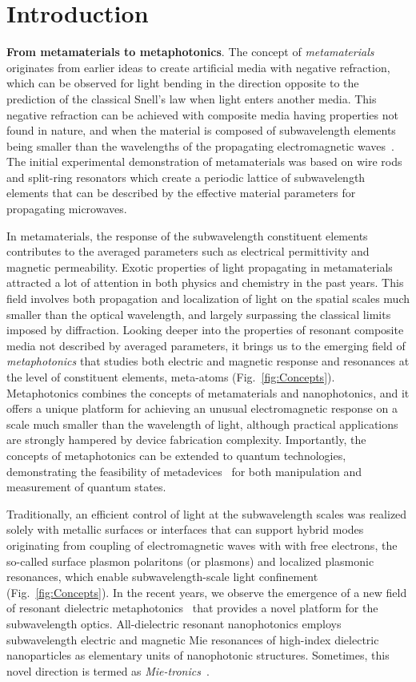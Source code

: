 \documentclass[journal=chreay,manuscript=review]{achemso}
\begin{document}
\section{Introduction}

{\bf From metamaterials to metaphotonics}. The concept of {\it metamaterials} originates from earlier ideas to create artificial media with negative refraction, which can be observed for light bending in the direction opposite to the prediction of the classical Snell’s law when light enters another media. This negative refraction can be achieved with composite media having properties not found in nature, and when the material is composed of subwavelength elements being smaller than the wavelengths of the propagating electromagnetic waves~\cite{xiang_2011}. The initial experimental demonstration of metamaterials was based on wire rods and split-ring resonators \cite{smith_2004} which create a periodic lattice of subwavelength elements that can be described by the effective material parameters for propagating microwaves.

In metamaterials, the response of the subwavelength constituent elements contributes to the averaged parameters such as electrical permittivity and magnetic permeability. Exotic properties of light propagating in metamaterials attracted a lot of attention in both physics and chemistry in the past years. This field involves both propagation and localization of light on the spatial scales much smaller than the optical wavelength, and largely surpassing the classical limits imposed by diffraction. Looking deeper into the properties of resonant composite media not described by averaged parameters, it brings us to the emerging field of {\it metaphotonics} that studies both electric and magnetic response and resonances at the level of constituent elements, meta-atoms (Fig.~\ref{fig:Concepts}). Metaphotonics combines the concepts of metamaterials and nanophotonics, and it offers a unique platform for achieving an unusual electromagnetic response on a scale much smaller than the wavelength of light, although practical applications are strongly hampered by device fabrication complexity. Importantly, the concepts of metaphotonics can be extended to quantum technologies, demonstrating the feasibility of metadevices~\cite{metadevices} for both manipulation and measurement of quantum states.

Traditionally, an efficient control of light at the subwavelength scales was realized solely with metallic surfaces or interfaces that can support  hybrid modes originating from coupling of electromagnetic waves with with free electrons, the so-called surface plasmon polaritons (or plasmons) and localized plasmonic resonances, which enable subwavelength-scale light confinement~\cite{plasmonics} (Fig.~\ref{fig:Concepts}). In the recent years, we observe the emergence of a new field of resonant dielectric metaphotonics~\cite{kuznetsov2016optically} that provides a novel platform for the subwavelength optics. All-dielectric resonant nanophotonics employs subwavelength electric and magnetic Mie resonances of high-index dielectric nanoparticles as elementary units of nanophotonic structures. Sometimes, this novel direction is termed as {\it Mie-tronics}~\cite{Mie_won}. 
\end{document}

